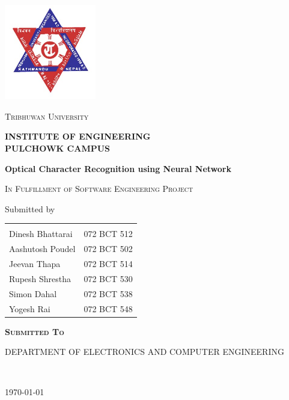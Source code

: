 
\begin{titlepage}
	\centering
	\includegraphics[width=40mm]{img/tu}\par\vspace{1cm}
	{\scshape\LARGE Tribhuwan University \par}

	\textsc{\bfseries INSTITUTE OF ENGINEERING}\\
	\textsc{\bfseries PULCHOWK CAMPUS}\\

	\vspace{1cm}
	{\huge\bfseries Optical Character Recognition using Neural Network\par}
	{\scshape In Fulfillment of Software Engineering Project\par}
	\vspace{1.5cm}
\normalsize Submitted by \\
\begin{table}[h]
\centering
\begin{tabular}{lr}\hline \\
		Dinesh Bhattarai    &   072 BCT 512\\
		Aashutosh Poudel    &   072 BCT 502\\
		Jeevan Thapa        &   072 BCT 514\\
		Rupesh Shrestha     &   072 BCT 530\\
		Simon Dahal         &   072 BCT 538\\
		Yogesh Rai          &   072 BCT 548\\ \hline
\end{tabular}
\end{table}
	\vspace{1.1cm}
	\textsc{\bfseries Submitted To}
	\
	
	{\scshape DEPARTMENT OF ELECTRONICS AND COMPUTER ENGINEERING\par}
\

	{\large \today\par}
\end{titlepage}
